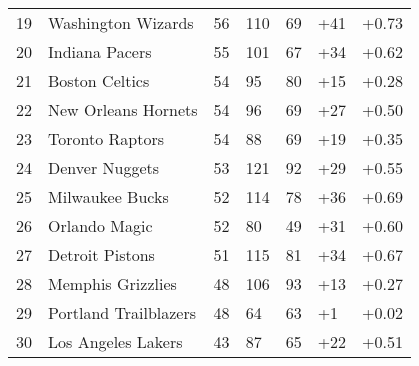 \documentclass{article}
\begin{document}
\begin{tabular}{|l|l|l|l|l|l|l|}
19 & Washington Wizards & 56 & 110 & 69 & +41 & +0.73 \\
20 & Indiana Pacers & 55 & 101 & 67 & +34 & +0.62 \\
21 & Boston Celtics & 54 & 95 & 80 & +15 & +0.28 \\
22 & New Orleans Hornets & 54 & 96 & 69 & +27 & +0.50 \\
23 & Toronto Raptors & 54 & 88 & 69 & +19 & +0.35 \\
24 & Denver Nuggets & 53 & 121 & 92 & +29 & +0.55 \\
25 & Milwaukee Bucks & 52 & 114 & 78 & +36 & +0.69 \\
26 & Orlando Magic & 52 & 80 & 49 & +31 & +0.60 \\
27 & Detroit Pistons & 51 & 115 & 81 & +34 & +0.67 \\
28 & Memphis Grizzlies & 48 & 106 & 93 & +13 & +0.27 \\
29 & Portland Trailblazers & 48 & 64 & 63 & +1 & +0.02 \\
30 & Los Angeles Lakers & 43 & 87 & 65 & +22 & +0.51 \\
\hline
\end{tabular}
\end{document}
